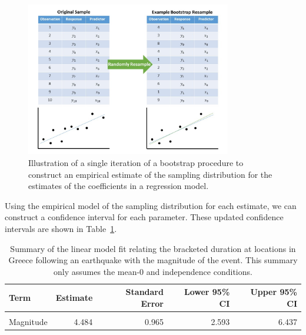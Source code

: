 \documentclass[
  letterpaper,
  DIV=11,
  numbers=noendperiod]{scrreprt}
\theoremstyle{definition}
\theoremstyle{definition}
\theoremstyle{plain}
\theoremstyle{remark}
\begin{document}
\begin{figure}

{\centering \includegraphics[width=0.8\textwidth,height=\textheight]{./images/RegConditions-Bootstrap.jpg}

}

\caption{\label{fig-regconditions-bootstrap}Illustration of a single
iteration of a bootstrap procedure to construct an empirical estimate of
the sampling distribution for the estimates of the coefficients in a
regression model.}

\end{figure}

Using the empirical model of the sampling distribution for each
estimate, we can construct a confidence interval for each parameter.
These updated confidence intervals are shown in
Table~\ref{tbl-regconditions-slr-summary-alt}.

\hypertarget{tbl-regconditions-slr-summary-alt}{}
\begin{table}
\caption{\label{tbl-regconditions-slr-summary-alt}Summary of the linear model fit relating the bracketed duration at
locations in Greece following an earthquake with the magnitude of the
event. This summary only assumes the mean-0 and independence conditions. }\tabularnewline

\centering
\begin{tabular}[t]{lrrrr}
\toprule
Term & Estimate & Standard Error & Lower 95\% CI & Upper 95\% CI\\
\midrule
\cellcolor{gray!6}{(Intercept)} & \cellcolor{gray!6}{-19.194} & \cellcolor{gray!6}{4.960} & \cellcolor{gray!6}{-29.258} & \cellcolor{gray!6}{-9.545}\\
Magnitude & 4.484 & 0.965 & 2.593 & 6.437\\
\bottomrule
\end{tabular}
\end{table}
\end{document}

